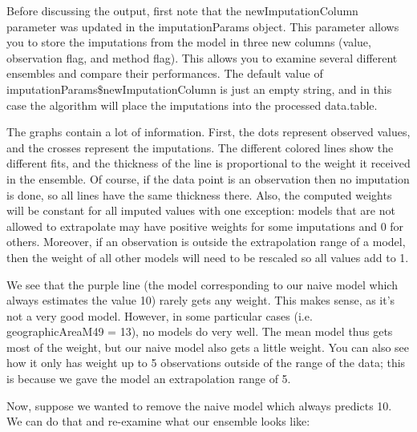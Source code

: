 \documentclass[nojss]{jss}\usepackage[]{graphicx}\usepackage[]{color}
\begin{document}
Before discussing the output, first note that the newImputationColumn parameter
was updated in the imputationParams object.  This parameter allows you to store
the imputations from the model in three new columns (value, observation flag,
and method flag).  This allows you to examine several different ensembles and
compare their performances.  The default value of
imputationParams\$newImputationColumn is just an empty string, and in this case
the algorithm will place the imputations into the processed data.table.

The graphs contain a lot of information.  First, the dots represent observed
values, and the crosses represent the imputations.  The different colored lines
show the different fits, and the thickness of the line is proportional to the
weight it received in the ensemble.  Of course, if the data point is an
observation then no imputation is done, so all lines have the same thickness
there.  Also, the computed weights will be constant for all imputed values with
one exception: models that are not allowed to extrapolate may have positive
weights for some imputations and 0 for others.  Moreover, if an observation
is outside the extrapolation range of a model, then the weight of all other
models will need to be rescaled so all values add to 1.

We see that the purple line (the model corresponding to our naive model which
always estimates the value 10) rarely gets any weight.  This makes sense, as
it's not a very good model.  However, in some particular cases (i.e.
geographicAreaM49 = 13), no models do very well.  The mean model thus gets most
of the weight, but our naive model also gets a little weight.  You can also see
how it only has weight up to 5 observations outside of the range of the data;
this is because we gave the model an extrapolation range of 5.

Now, suppose we wanted to remove the naive model which always predicts 10.  We
can do that and re-examine what our ensemble looks like:
\end{document}
